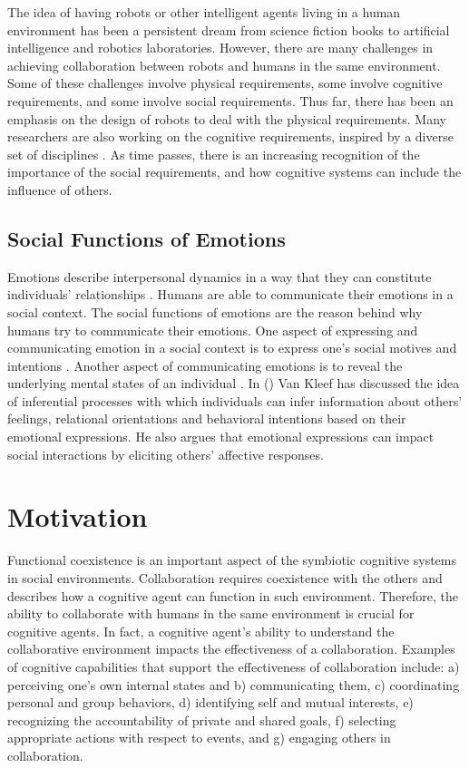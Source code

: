 \documentclass[letterpaper]{article}
\begin{document}
The idea of having robots or other intelligent agents living in a human
environment has been a persistent dream from science fiction books to artificial
intelligence and robotics laboratories. However, there are many challenges in
achieving collaboration between robots and humans in the same environment. Some
of these challenges involve physical requirements, some involve cognitive
requirements, and some involve social requirements. Thus far, there has been an
emphasis on the design of robots to deal with the physical requirements. Many
researchers are also working on the cognitive requirements, inspired by a
diverse set of disciplines \cite{laird:soar,scheutz:integration-cognition}.
As time passes, there is an increasing recognition of the importance of the
social requirements, and how cognitive systems can include the influence of
others.

\subsection{Social Functions of Emotions}

Emotions describe interpersonal dynamics in a way that they can constitute
individuals' relationships \cite{tiedens:social-life}. Humans are able to
communicate their emotions in a social context. The social functions of emotions
are the reason behind why humans try to communicate their emotions. One aspect
of expressing and communicating emotion in a social context is to express one's
social motives and intentions \cite{hess:darwin-emotion}. Another aspect of
communicating emotions is to reveal the underlying mental states of an
individual \cite{parkinson:emotion-communication}. In
(\citeyear{kleef:emotion-regulate-social}) Van Kleef has discussed the idea of
inferential processes with which individuals can infer information about others'
feelings, relational orientations and behavioral intentions based on their
emotional expressions. He also argues that emotional expressions can impact
social interactions by eliciting others' affective responses.

\section{Motivation}

Functional coexistence is an important aspect of the symbiotic cognitive
systems in social environments. Collaboration requires coexistence with
the others and describes how a cognitive agent can function in such environment.
Therefore, the ability to collaborate with humans in the same environment is
crucial for cognitive agents. In fact, a cognitive agent's ability to understand
the collaborative environment impacts the effectiveness of a collaboration.
Examples of cognitive capabilities that support the effectiveness of
collaboration include: a) perceiving one's own internal states and b)
communicating them, c) coordinating personal and group behaviors, d) identifying
self and mutual interests, e) recognizing the accountability of private and
shared goals, f) selecting appropriate actions with respect to events, and g)
engaging others in collaboration.
\end{document}
